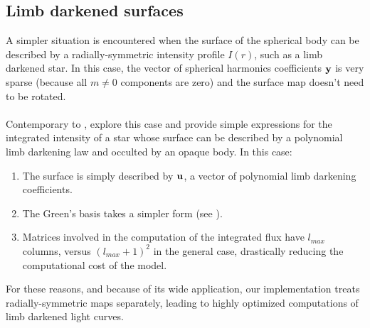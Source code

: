 \documentclass[modern]{aastex631}
\begin{document}
\subsection{Limb darkened surfaces}
A simpler situation is encountered when the surface of the spherical body can be described by a radially-symmetric intensity profile $I(r)$, such as a limb darkened star. In this case, the vector of spherical harmonics coefficients ${\mathbf{y}}$ is very sparse (because all $m\neq0$ components are zero) and the surface map doesn't need to be rotated.\\\\
Contemporary to \cite{starry}, \cite{Agol2020} explore this case and provide simple expressions for the integrated intensity of a star whose surface can be described by a polynomial limb darkening law and occulted by an opaque body. In this case:
\begin{enumerate}
    \item The surface is simply described by ${\mathbf{u}}$, a vector of polynomial limb darkening coefficients.
    \item The Green's basis takes a simpler form (see \citealt[Equation 14]{Agol2020}).
    \item Matrices involved in the computation of the integrated flux have $l_{max}$ columns, versus $(l_{max}+1)^2$ in the general case, drastically reducing the computational cost of the model.
\end{enumerate}
For these reasons, and because of its wide application, our implementation treats radially-symmetric maps separately, leading to highly optimized computations of limb darkened light curves.\\\\

\newpage
\end{document}
